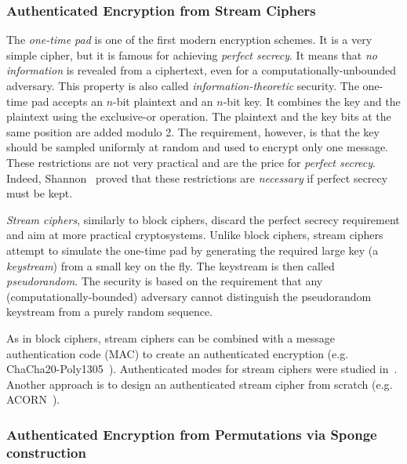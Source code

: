 \subsubsection{Authenticated Encryption from Stream Ciphers}

The \emph{one-time pad} is one of the first modern encryption schemes. It is a very simple cipher, but it is famous for achieving \emph{perfect secrecy}. It means that \emph{no information} is revealed from a ciphertext, even for a computationally-unbounded adversary. This property is also called \emph{information-theoretic} security. The one-time pad accepts an $n$-bit plaintext and an $n$-bit key. It combines the key and the plaintext using the exclusive-or operation. The plaintext and the key bits at the same position are added modulo 2. The requirement, however, is that the key should be sampled uniformly at random and used to encrypt only one message. These restrictions are not very practical and are the price for \emph{perfect secrecy}. Indeed, Shannon~\cite{Shannon} proved that these restrictions are \emph{necessary} if perfect secrecy must be kept.

\emph{Stream ciphers}, similarly to block ciphers, discard the perfect secrecy requirement and aim at more practical cryptosystems. Unlike block ciphers, stream ciphers attempt to simulate the one-time pad by generating the required large key (a \emph{keystream}) from a small key on the fly. The keystream is then called \emph{pseudorandom}. The security is based on the requirement that any (computationally-bounded) adversary cannot distinguish the pseudorandom keystream from a purely random sequence.

As in block ciphers, stream ciphers can be combined with a message authentication code (MAC) to create an authenticated encryption (e.g. ChaCha20-Poly1305~\cite{chachapoly}). Authenticated modes for stream ciphers were studied in~\cite{streamae}. Another approach is to design an authenticated stream cipher from scratch (e.g. ACORN~\cite{ACORN}).


\subsubsection{Authenticated Encryption from Permutations via Sponge construction}

